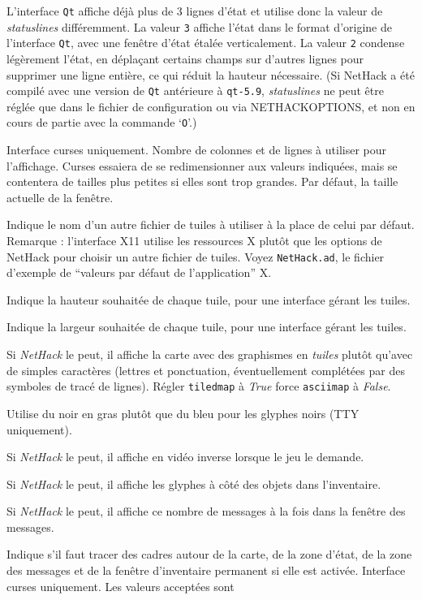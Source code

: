 \documentclass[titlepage]{article}
\begin{document}
\begin{description}[font=\mdseries\itshape]
L'interface \texttt{Qt} affiche déjà plus de 3 lignes d'état
et utilise donc la valeur de
\textit{statuslines}
différemment.
La valeur \texttt{3} affiche l'état dans le format d'origine de
l'interface \texttt{Qt}, avec une fenêtre d'état étalée verticalement.
La valeur \texttt{2} condense légèrement l'état, en déplaçant certains
champs sur d'autres lignes pour supprimer une ligne entière, ce qui réduit
la hauteur nécessaire.
(Si NetHack a été compilé avec une version de \texttt{Qt}
antérieure à \texttt{qt-5.9},
\textit{statuslines}
ne peut être réglée que dans le fichier de configuration ou via NETHACKOPTIONS,
et non en cours de partie avec la commande `\texttt{O}'.)
\item[term\textunderscore cols \textrm{et}]
\item[term\textunderscore rows]
Interface curses uniquement.
Nombre de colonnes et de lignes à utiliser pour l'affichage.
Curses essaiera de se redimensionner aux valeurs indiquées, mais se contentera
de tailles plus petites si elles sont trop grandes.
Par défaut, la taille actuelle de la fenêtre.
\item[tile\textunderscore file]
Indique le nom d'un autre fichier de tuiles à utiliser à la place de celui par défaut.
\\
Remarque : l'interface X11 utilise les ressources X plutôt que les options de
NetHack pour choisir un autre fichier de tuiles.
Voyez \texttt{NetHack.ad}, le fichier d'exemple de ``valeurs par défaut de l'application'' X.
\item[tile\textunderscore height]
Indique la hauteur souhaitée de chaque tuile, pour une interface gérant les tuiles.
\item[tile\textunderscore width]
Indique la largeur souhaitée de chaque tuile, pour une interface gérant les tuiles.
\item[tiled\textunderscore map]
Si \textit{NetHack} le peut, il affiche la carte avec des graphismes en \textit{tuiles}
plutôt qu'avec de simples caractères (lettres et ponctuation, éventuellement
complétées par des symboles de tracé de lignes).
Régler \texttt{tiled\textunderscore map} à \textit{True} force
\texttt{ascii\textunderscore map} à \textit{False}.
\item[use\textunderscore darkgray]
Utilise du noir en gras plutôt que du bleu pour les glyphes noirs (TTY uniquement).
\item[use\textunderscore inverse]
Si \textit{NetHack} le peut, il affiche en vidéo inverse lorsque le jeu le demande.
\item[use\textunderscore menu\textunderscore glyphs]
Si \textit{NetHack} le peut, il affiche les glyphes à côté des objets dans
l'inventaire.
\item[vary\textunderscore msgcount]
Si \textit{NetHack} le peut, il affiche ce nombre de messages à la fois
dans la fenêtre des messages.
\item[windowborders]
Indique s'il faut tracer des cadres autour de la carte, de la zone d'état, de la
zone des messages et de la fenêtre d'inventaire permanent si elle est activée.
Interface curses uniquement.
Les valeurs acceptées sont


\end{description}
\end{document}
